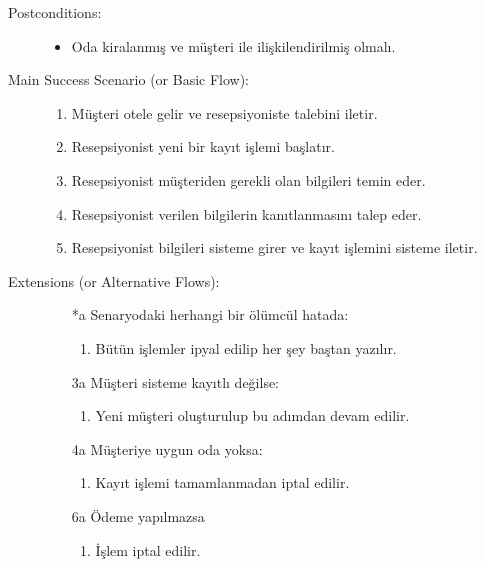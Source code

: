 \documentclass[12pt,a4paper]{report}
\begin{document}
\begin{description}
\item[Postconditions:] \hspace{10mm}
\begin{itemize}
\item Oda kiralanmış ve müşteri ile ilişkilendirilmiş olmalı.
\end{itemize}
\item[Main Success Scenario (or Basic Flow):] \hspace{10mm}
\begin{enumerate}
\item Müşteri otele gelir ve resepsiyoniste talebini iletir.
\item Resepsiyonist yeni bir kayıt işlemi başlatır.
\item Resepsiyonist müşteriden gerekli olan bilgileri temin eder.
\item Resepsiyonist verilen bilgilerin kanıtlanmasını talep eder.
\item Resepsiyonist bilgileri sisteme girer ve kayıt işlemini sisteme iletir.
\end{enumerate}
\item[Extensions (or Alternative Flows):] \hspace{10mm}
\begin{itemize}
\item[*a] Senaryodaki herhangi bir ölümcül hatada:
    \begin{enumerate}
    \item Bütün işlemler ipyal edilip her şey baştan yazılır.
    \end{enumerate}
\item[3a] Müşteri sisteme kayıtlı değilse:
    \begin{enumerate}
    \item Yeni müşteri oluşturulup bu adımdan devam edilir.
    \end{enumerate}
\item[4a] Müşteriye uygun oda yoksa:
    \begin{enumerate} 
    \item Kayıt işlemi tamamlanmadan iptal edilir.
    \end{enumerate}
\item[6a] Ödeme yapılmazsa
    \begin{enumerate}
    \item İşlem iptal edilir.
    \end{enumerate}
\end{itemize}
\end{description}
\end{document}
